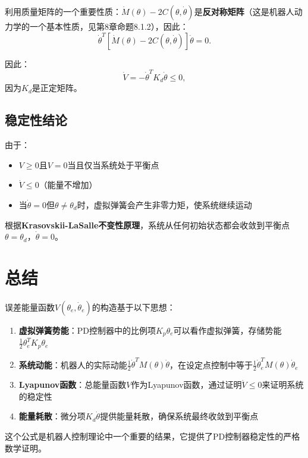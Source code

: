 \documentclass{article}
\begin{document}
利用质量矩阵的一个重要性质：$\dot{M}(\theta) - 2C(\theta, \dot{\theta})$是\textbf{反对称矩阵}（这是机器人动力学的一个基本性质，见第8章命题8.1.2），因此：
\begin{equation}
\dot{\theta}^T[\dot{M}(\theta) - 2C(\theta, \dot{\theta})]\dot{\theta} = 0.
\end{equation}

因此：
\begin{equation}
\dot{V} = -\dot{\theta}^T K_d\dot{\theta} \leq 0,
\end{equation}
因为$K_d$是正定矩阵。

\subsection{稳定性结论}

由于：
\begin{itemize}
\item $V \geq 0$且$V = 0$当且仅当系统处于平衡点
\item $\dot{V} \leq 0$（能量不增加）
\item 当$\dot{\theta} = 0$但$\theta \neq \theta_d$时，虚拟弹簧会产生非零力矩，使系统继续运动
\end{itemize}

根据\textbf{Krasovskii-LaSalle不变性原理}，系统从任何初始状态都会收敛到平衡点$\theta = \theta_d$，$\dot{\theta} = 0$。

\section{总结}

误差能量函数$V(\theta_e, \dot{\theta}_e)$的构造基于以下思想：

\begin{enumerate}
\item \textbf{虚拟弹簧势能}：PD控制器中的比例项$K_p\theta_e$可以看作虚拟弹簧，存储势能$\frac{1}{2}\theta_e^T K_p\theta_e$

\item \textbf{系统动能}：机器人的实际动能$\frac{1}{2}\dot{\theta}^T M(\theta)\dot{\theta}$，在设定点控制中等于$\frac{1}{2}\dot{\theta}_e^T M(\theta)\dot{\theta}_e$

\item \textbf{Lyapunov函数}：总能量函数$V$作为Lyapunov函数，通过证明$\dot{V} \leq 0$来证明系统的稳定性

\item \textbf{能量耗散}：微分项$K_d\dot{\theta}$提供能量耗散，确保系统最终收敛到平衡点
\end{enumerate}

这个公式是机器人控制理论中一个重要的结果，它提供了PD控制器稳定性的严格数学证明。
\end{document}
